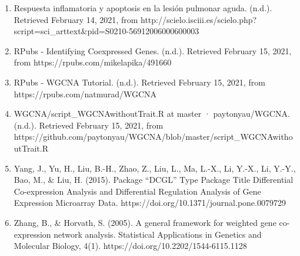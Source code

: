 \documentclass{bmcart}
\begin{document}
\begin{backmatter}
\begin{enumerate}
			\item Respuesta inflamatoria y apoptosis en la lesión pulmonar aguda. (n.d.). Retrieved February 14, 2021, from http://scielo.isciii.es/scielo.php?script=sci\_arttext\&pid=S0210-56912006000600003
			
			\item RPubs - Identifying Coexpressed Genes. (n.d.). Retrieved February 15, 2021, from https://rpubs.com/mikelapika/491660
			
			
			\item RPubs - WGCNA Tutorial. (n.d.). Retrieved February 15, 2021, from https://rpubs.com/natmurad/WGCNA
			
			\item WGCNA/script\_WGCNAwithoutTrait.R at master · paytonyau/WGCNA. (n.d.). Retrieved February 15, 2021, from https://github.com/paytonyau/WGCNA/blob/master/script\_WGCNAwithoutTrait.R
			
			
			\item Yang, J., Yu, H., Liu, B.-H., Zhao, Z., Liu, L., Ma, L.-X., Li, Y.-X., Li, Y.-Y., Bao, M., \& Liu, H. (2015). Package “DCGL” Type Package Title Differential Co-expression Analysis and Differential Regulation Analysis of Gene Expression Microarray Data. https://doi.org/10.1371/journal.pone.0079729
			
			\item Zhang, B., \& Horvath, S. (2005). A general framework for weighted gene co-expression network analysis. Statistical Applications in Genetics and Molecular Biology, 4(1). https://doi.org/10.2202/1544-6115.1128
			
			
		\end{enumerate}
	
	\end{backmatter}
\end{document}
